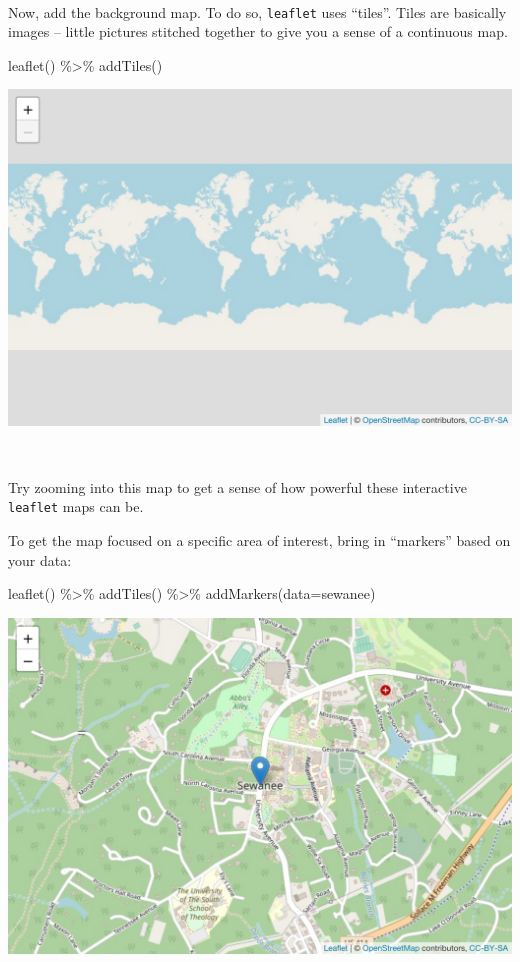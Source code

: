 \documentclass[
]{book}
\newenvironment{Shaded}{\begin{snugshade}}{\end{snugshade}}
\newcommand{\AttributeTok}[1]{\textcolor[rgb]{0.77,0.63,0.00}{#1}}
\newcommand{\FunctionTok}[1]{\textcolor[rgb]{0.00,0.00,0.00}{#1}}
\newcommand{\NormalTok}[1]{#1}
\newcommand{\SpecialCharTok}[1]{\textcolor[rgb]{0.00,0.00,0.00}{#1}}
\begin{document}
~

Now, add the background map. To do so, \texttt{leaflet} uses ``tiles''. Tiles are basically images -- little pictures stitched together to give you a sense of a continuous map.

\begin{Shaded}
\begin{Highlighting}[]
\FunctionTok{leaflet}\NormalTok{() }\SpecialCharTok{\%\textgreater{}\%} \FunctionTok{addTiles}\NormalTok{() }
\end{Highlighting}
\end{Shaded}

\includegraphics[width=694.08px]{figures/unnamed-chunk-221-1}

~

Try zooming into this map to get a sense of how powerful these interactive \texttt{leaflet} maps can be.

To get the map focused on a specific area of interest, bring in ``markers'' based on your data:

\begin{Shaded}
\begin{Highlighting}[]
\FunctionTok{leaflet}\NormalTok{() }\SpecialCharTok{\%\textgreater{}\%} 
    \FunctionTok{addTiles}\NormalTok{() }\SpecialCharTok{\%\textgreater{}\%} 
    \FunctionTok{addMarkers}\NormalTok{(}\AttributeTok{data=}\NormalTok{sewanee)}
\end{Highlighting}
\end{Shaded}

\includegraphics[width=694.08px]{figures/unnamed-chunk-222-1}
\end{document}
